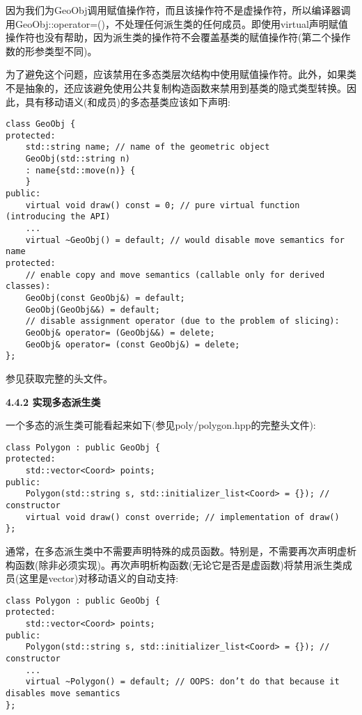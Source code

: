 因为我们为GeoObj调用赋值操作符，而且该操作符不是虚操作符，所以编译器调用GeoObj::operator=()，不处理任何派生类的任何成员。即使用virtual声明赋值操作符也没有帮助，因为派生类的操作符不会覆盖基类的赋值操作符(第二个操作数的形参类型不同)。\par

为了避免这个问题，应该禁用在多态类层次结构中使用赋值操作符。此外，如果类不是抽象的，还应该避免使用公共复制构造函数来禁用到基类的隐式类型转换。因此，具有移动语义(和成员)的多态基类应该如下声明:\par

\begin{lstlisting}[caption={}]
class GeoObj {
protected:
	std::string name; // name of the geometric object
	GeoObj(std::string n)
	: name{std::move(n)} {
	}
public:
	virtual void draw() const = 0; // pure virtual function (introducing the API)
	...
	virtual ~GeoObj() = default; // would disable move semantics for name
protected:
	// enable copy and move semantics (callable only for derived classes):
	GeoObj(const GeoObj&) = default;
	GeoObj(GeoObj&&) = default;
	// disable assignment operator (due to the problem of slicing):
	GeoObj& operator= (GeoObj&&) = delete;
	GeoObj& operator= (const GeoObj&) = delete;
};
\end{lstlisting}

参见{\color{red}{poly/geoobj.hpp}}获取完整的头文件。

\hspace*{\fill} \par %
\textbf{4.4.2 实现多态派生类}

一个多态的派生类可能看起来如下(参见poly/polygon.hpp的完整头文件):\par

\begin{lstlisting}[caption={}]
class Polygon : public GeoObj {
protected:
	std::vector<Coord> points;
public:
	Polygon(std::string s, std::initializer_list<Coord> = {}); // constructor
	virtual void draw() const override; // implementation of draw()
};
\end{lstlisting}

通常，在多态派生类中不需要声明特殊的成员函数。特别是，不需要再次声明虚析构函数(除非必须实现)。再次声明析构函数(无论它是否是虚函数)将禁用派生类成员(这里是vector)对移动语义的自动支持:\par

\begin{lstlisting}[caption={}]
class Polygon : public GeoObj {
protected:
	std::vector<Coord> points;
public:
	Polygon(std::string s, std::initializer_list<Coord> = {}); // constructor
	...
	virtual ~Polygon() = default; // OOPS: don’t do that because it disables move semantics
};
\end{lstlisting}

